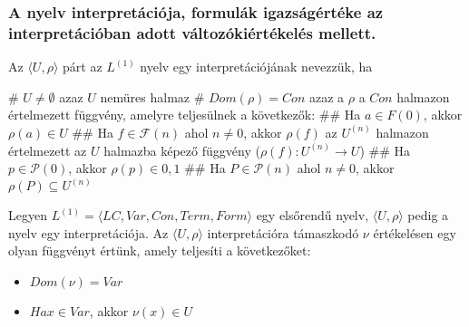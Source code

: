 \subsubsection{A nyelv interpretációja, formulák igazságértéke az interpretációban adott változókiértékelés mellett.}
\begin{definition}
	Az $\langle U, \rho\rangle$ párt az $L^{(1)}$ nyelv egy interpretációjának nevezzük, ha\\
	\begin{easylist}
		# $U \neq \emptyset$ azaz $U$ nemüres halmaz
		# $Dom(\rho) = Con$ azaz a $\rho$ a $Con$ halmazon értelmezett függvény, amelyre teljesülnek a következők:
		## Ha $a \in F(0)$, akkor $\rho(a) \in U$
		## Ha $f \in \mathcal{F}(n)$ ahol $n\neq 0$, akkor $\rho(f)$ az $U^{(n)}$ halmazon értelmezett az $U$ halmazba képező függvény ($\rho(f) : U^{(n)} \rightarrow U $)
		## Ha $p \in \mathcal{P}(0)$, akkor $\rho(p) \in {0, 1}$
		## Ha $P \in \mathcal{P}(n)$ ahol $n \neq 0$, akkor $\rho(P) \subseteq U^{(n)}$
	\end{easylist}
\end{definition}
\begin{definition}
	Legyen $L^{(1)} = \langle LC, Var, Con, Term, Form\rangle$ egy elsőrendű nyelv, $\langle U, \rho\rangle$ pedig a nyelv egy interpretációja. Az $\langle U, \rho\rangle$ interpretációra támaszkodó $\nu$ értékelésen egy olyan függvényt értünk, amely teljesíti a következőket:
	\begin{itemize}
		\item  $ Dom(\nu) = Var $
		\item  $ Ha x \in Var$, akkor $\nu(x) \in U $
	\end{itemize}
\end{definition}
